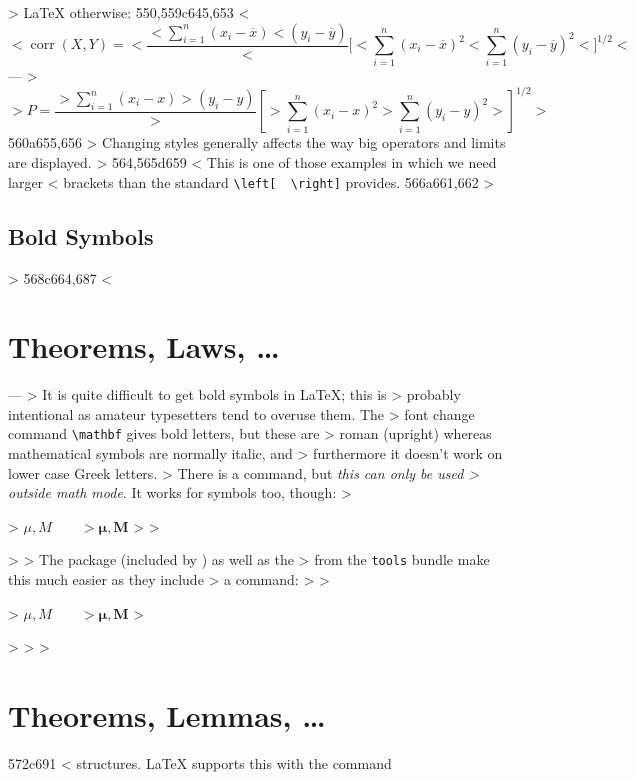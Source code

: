 \begin{example}
> \LaTeX{} otherwise:
550,559c645,653
< \begin{displaymath}
< \mathop{\mathrm{corr}}(X,Y)= 
<  \frac{\displaystyle 
<    \sum_{i=1}^n(x_i-\overline x)
<    (y_i-\overline y)} 
<   {\displaystyle\biggl[
<  \sum_{i=1}^n(x_i-\overline x)^2
< \sum_{i=1}^n(y_i-\overline y)^2
< \biggr]^{1/2}}
< \end{displaymath}    
---
> \begin{equation*}
>  P = \frac{\displaystyle{ 
>    \sum_{i=1}^n (x_i- x)
>    (y_i- y)}} 
>    {\displaystyle{\left[
>    \sum_{i=1}^n(x_i-x)^2
>    \sum_{i=1}^n(y_i- y)^2
>    \right]^{1/2}}}
> \end{equation*}    
560a655,656
> Changing styles generally affects the way big operators and limits are displayed.
> 
564,565d659
< \noindent This is one of those examples in which we need larger
< brackets than the standard \verb|\left[  \right]| provides.
566a661,662
> \subsection{Bold Symbols}
> 
568c664,687
< \section{Theorems, Laws, \ldots}
---
> It is quite difficult to get bold symbols in \LaTeX{}; this is
> probably intentional as amateur typesetters tend to overuse them.  The
> font change command \verb|\mathbf| gives bold letters, but these are
> roman (upright) whereas mathematical symbols are normally italic, and
> furthermore it doesn't work on lower case Greek letters.
> There is a  command, but \emph{this can only be used
> outside math mode}. It works for symbols too, though:
> \begin{example}
> $\mu, M \qquad 
> \mathbf{\mu}, \mathbf{M}$
> \qquad {}
> \end{example}
> 
> The package  (included by ) as well as the
>  from the \texttt{tools} bundle make this much easier as they include
> a  command:
> 
> \begin{example}
> $\mu, M \qquad
> \boldsymbol{\mu}, \boldsymbol{M}$
> \end{example}
> 
> 
> \section{Theorems, Lemmas, \ldots}
572c691
< structures. \LaTeX{} supports this with the command

\end{example}
